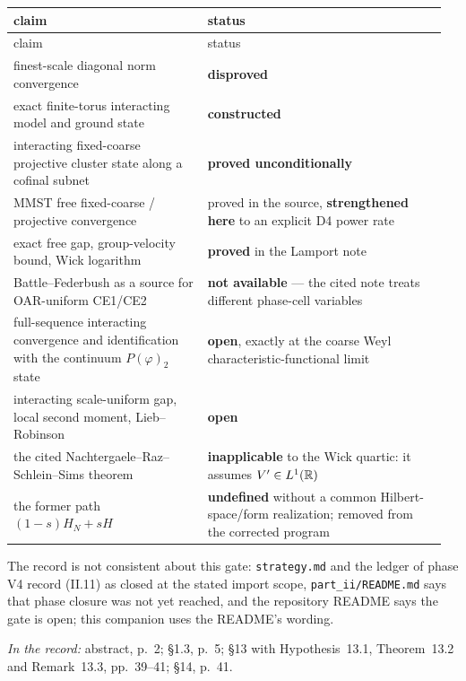 {\footnotesize
\setlength{\tabcolsep}{4pt}
\setlength{\LTpre}{4pt}\setlength{\LTpost}{4pt}
\begin{longtable}{@{}>{\raggedright\arraybackslash}p{0.43\linewidth}
                   >{\raggedright\arraybackslash}p{0.53\linewidth}@{}}
\toprule
claim & status\\
\midrule
\endfirsthead
\toprule
claim & status\\
\midrule
\endhead
\bottomrule
\endlastfoot
finest-scale diagonal norm convergence & \textbf{disproved}\\
exact finite-torus interacting model and ground state & \textbf{constructed}\\
interacting fixed-coarse projective cluster state along a cofinal subnet &
  \textbf{proved unconditionally}\\
MMST free fixed-coarse / projective convergence & proved in the source,
  \textbf{strengthened here} to an explicit D4 power rate\\
exact free gap, group-velocity bound, Wick logarithm & \textbf{proved} in the Lamport
  note\\
Battle--Federbush as a source for OAR-uniform CE1/CE2 & \textbf{not available} --- the
  cited note treats different phase-cell variables\\
full-sequence interacting convergence and identification with the continuum
  $P(\varphi)_2$ state & \textbf{open}, exactly at the coarse Weyl
  characteristic-functional limit\\
interacting scale-uniform gap, local second moment, Lieb--Robinson & \textbf{open}\\
the cited Nachtergaele--Raz--Schlein--Sims theorem & \textbf{inapplicable} to the Wick
  quartic: it assumes $V'\in L^1(\mathbb{R})$\\
the former path $(1-s)H_N+sH$ & \textbf{undefined} without a common Hilbert-space/form
  realization; removed from the corrected program\\
\end{longtable}
}

The record is not consistent about this gate: \texttt{strategy.md} and the ledger of
phase V4 record (II.11) as closed at the stated import scope, \texttt{part\_ii/README.md}
says that phase closure was not yet reached, and the repository README says the gate is
open; this companion uses the README's wording.

\noindent\emph{In the record:} abstract, p.~2; \S1.3, p.~5; \S13 with Hypothesis~13.1,
Theorem~13.2 and Remark~13.3, pp.~39--41; \S14, p.~41.
